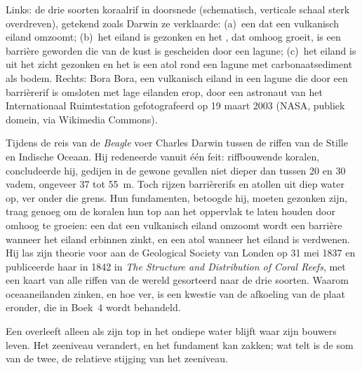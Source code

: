 \begin{omfigure}
{\small Links: de drie soorten koraalrif in doorsnede (schematisch, verticale schaal sterk overdreven), getekend zoals Darwin ze verklaarde: (a)~een  dat een vulkanisch eiland omzoomt; (b)~het eiland is gezonken en het , dat omhoog groeit, is een barrière geworden die van de kust is gescheiden door een lagune; (c)~het eiland is uit het zicht gezonken en het  is een atol rond een lagune met carbonaatsediment als bodem. Rechts: Bora Bora, een vulkanisch eiland in een lagune die door een barrièrerif is omsloten met lage eilanden erop, door een astronaut van het Internationaal Ruimtestation gefotografeerd op 19 maart 2003 (NASA, publiek domein, via Wikimedia Commons).}
\label{fig:b1:chemical-biogenic-sediments:reefs}
\end{omfigure}

\begin{history}
Tijdens de reis van de \emph{Beagle} voer Charles Darwin tussen de riffen van de Stille en Indische Oceaan. Hij redeneerde vanuit één feit: riffbouwende koralen, concludeerde hij, gedijen in de gewone gevallen niet dieper dan tussen 20 en 30 vadem, ongeveer 37 tot \qty{55}{m}. Toch rijzen barrièrerifs en atollen uit diep water op, ver onder die grens. Hun fundamenten, betoogde hij, moeten gezonken zijn, traag genoeg om de koralen hun top aan het oppervlak te laten houden door omhoog te groeien: een  dat een vulkanisch eiland omzoomt wordt een barrière wanneer het eiland erbinnen zinkt, en een atol wanneer het eiland is verdwenen. Hij las zijn theorie voor aan de Geological Society van Londen op 31 mei 1837 en publiceerde haar in 1842 in \emph{The Structure and Distribution of Coral Reefs}, met een kaart van alle riffen van de wereld gesorteerd naar de drie soorten. Waarom oceaaneilanden zinken, en hoe ver, is een kwestie van de afkoeling van de plaat eronder, die in Boek~4 wordt behandeld.
\end{history}

Een  overleeft alleen als zijn top in het ondiepe water blijft waar zijn bouwers leven. Het zeeniveau verandert, en het fundament kan zakken; wat telt is de som van de twee, de relatieve stijging van het zeeniveau.

